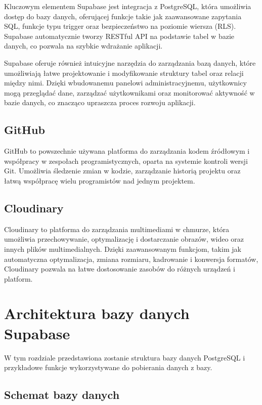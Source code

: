 \documentclass[12pt,twoside]{article}
\begin{document}
Kluczowym elementem Supabase jest integracja z PostgreSQL, która umożliwia dostęp do bazy danych, oferującej
funkcje takie jak zaawansowane zapytania SQL, funkcje typu trigger oraz bezpieczeństwo na poziomie wiersza (RLS).
Supabase automatycznie tworzy RESTful API na podstawie tabel w bazie danych, co pozwala na szybkie
wdrażanie aplikacji. 

Supabase oferuje również intuicyjne narzędzia do zarządzania bazą danych, które umożliwiają łatwe projektowanie i 
modyfikowanie struktury tabel oraz relacji między nimi. Dzięki wbudowanemu panelowi administracyjnemu, użytkownicy 
mogą przeglądać dane, zarządzać użytkownikami oraz monitorować aktywność w bazie danych, co znacząco upraszcza 
proces rozwoju aplikacji.

\subsection{GitHub}

GitHub to powszechnie używana platforma do zarządzania kodem źródłowym i współpracy w zespołach programistycznych, 
oparta na systemie kontroli wersji Git. Umożliwia śledzenie zmian w kodzie, zarządzanie historią projektu oraz
łatwą współpracę wielu programistów nad jednym projektem.

\subsection{Cloudinary}

Cloudinary to platforma do zarządzania multimediami w chmurze, która umożliwia przechowywanie, optymalizację i 
dostarczanie obrazów, wideo oraz innych plików multimedialnych. Dzięki zaawansowanym funkcjom, takim jak 
automatyczna optymalizacja, zmiana rozmiaru, kadrowanie i konwersja formatów, Cloudinary pozwala na łatwe 
dostosowanie zasobów do różnych urządzeń i platform.


\clearpage

\section{Architektura bazy danych Supabase}

W tym rozdziale przedstawiona zostanie struktura bazy danych PostgreSQL i przykładowe funkcje wykorzystywane do 
pobierania danych z bazy.

\subsection{Schemat bazy danych}
\end{document}
